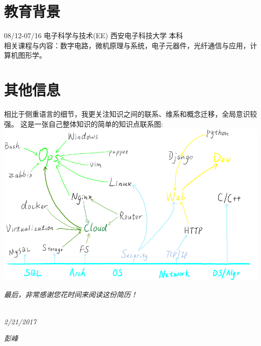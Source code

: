 \documentclass[]{friggeri-cv}
\begin{document}
\section{教育背景}
08/12\hspace{1mm}-\hspace{1mm}07/16 \hspace{27mm} 电子科学与技术(EE) \hspace{7mm}  西安电子科技大学  \hspace{7mm}  本科 \\

相关课程与内容：数字电路，微机原理与系统，电子元器件，光纤通信与应用，计算机图形学。\\


\section{其他信息}
相比于侧重语言的细节，我更关注知识之间的联系、维系和概念迁移，全局意识较强。
这是一张自己整体知识的简单的知识点联系图:\\
\includegraphics[scale=0.60]{img/devopsgraph.png}

\emph{
最后，非常感谢您花时间来阅读这份简历！\\}
~
\begin{flushleft}
\emph{2/21/2017}
\end{flushleft}
\begin{flushright}
\emph{彭峰}
\end{flushright}
\end{document}
